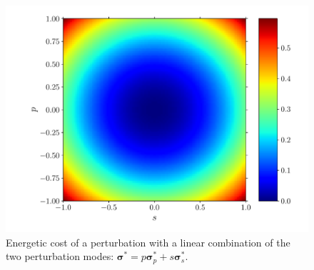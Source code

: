 \documentclass{goose-article}
\begin{document}
\begin{figure}[htp]
    \centering
    \includegraphics[width=.5\textwidth]{phase-diagram_energy.pdf}
    \caption{
        Energetic cost of a perturbation with a linear combination of the two
        perturbation modes:
        $\bm{\sigma}^* = p \bm{\sigma}^*_p + s \bm{\sigma}^*_s$.}
    \label{fig:energy}
\end{figure}
\end{document}
